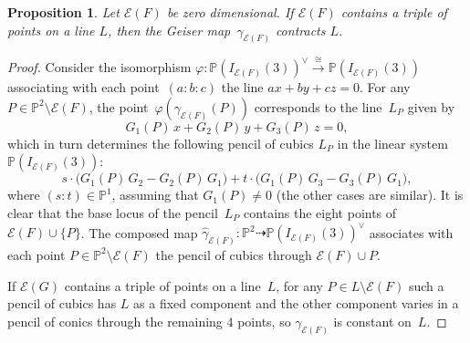 \documentclass{amsart}
\theoremstyle{plain}
\newtheorem{prop}[lemma]{Proposition}
\theoremstyle{definition}
\newcommand{\p}{\mathbb{P}}
\newcommand{\Eig}[1]{\mathcal{E}\!\left( {#1} \right)}
\begin{document}
\begin{prop}
\label{prop:allineati_contrae}
Let $\Eig{F}$ be zero dimensional.
If $\Eig{F}$ contains a triple of points on a line $L$, then the Geiser map~$\gamma_{\Eig{F}}$ contracts $L$.
\end{prop}

\begin{proof}
Consider the isomorphism  $\varphi \colon \p (I_{\Eig{F}}(3))^{\vee} \stackrel{\cong}{\longrightarrow} \p (I_{\Eig{F}}(3))$ associating with each point~$(a:b:c)$ the line $ax + by + cz = 0$.
For any $P \in \p^2 \setminus \Eig{F}$, the point~$\varphi(\gamma_{\Eig{F}} (P))$ corresponds to the line~$L_P$ given by
%
\[
  G_1 (P) \, x + G_2(P) \, y + G_3(P) \, z = 0,
\]
%
which in turn determines the following
pencil of cubics $L_P$ in the linear system $\p (I_{\Eig{F}}(3))$:
%
\[
  s \cdot \bigl( G_1(P) \, G_2 - G_2(P) \, G_1 \bigr) + t \cdot \bigl( G_1(P) \, G_3 - G_3(P) \, G_1 \bigr),
\]
%
where $(s: t) \in \p^1$, assuming that $G_1(P) \neq 0$ (the other cases are similar).
It is clear that the base locus of the pencil~$L_P$ contains the eight points of~$\Eig{F} \cup \{P\}$.
The composed map $\hat \gamma_{\Eig{F}} \colon \p^2 \dasharrow \p (I_{\Eig{F}}(3))^\vee$
associates with each point $P \in \p^2 \setminus \Eig{F}$ the pencil of cubics through $\Eig{F} \cup P$.

If $\Eig{G}$ contains a triple of points on a line~$L$, for any $P \in L \setminus \Eig{F}$ such a pencil of cubics has $L$ as a fixed component and the other component varies in a pencil of conics through the remaining $4$ points, so $\gamma_{\Eig{F}}$ is constant on~$L$.
\end{proof}


\end{document}
